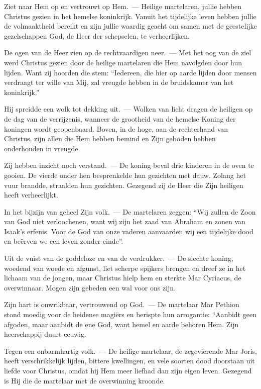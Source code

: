 \documentclass[12pt,twoside,a5paper]{article}
\begin{document}
\begin{halfparskip}
  Ziet naar Hem op en vertrouwt op Hem.~--- Heilige martelaren, jullie hebben Christus gezien in het hemelse koninkrijk. Vanuit het tijdelijke leven hebben jullie de volmaaktheid bereikt en zijn jullie waardig geacht om samen met de geestelijke gezelschappen God, de Heer der schepselen, te verheerlijken.

  De ogen van de Heer zien op de rechtvaardigen neer.~--- Met het oog van de ziel werd Christus gezien door de heilige martelaren die Hem navolgden door hun lijden. Want zij hoorden die stem: ``Iedereen, die hier op aarde lijden door mensen verdraagt ter wille van Mij, zal vreugde hebben in de bruidskamer van het koninkrijk.''

  Hij spreidde een wolk tot dekking uit.~--- Wolken van licht dragen de heiligen op de dag van de verrijzenis, wanneer de grootheid van de hemelse Koning der koningen wordt geopenbaard. Boven, in de hoge, aan de rechterhand van Christus, zijn allen die Hem hebben bemind en Zijn geboden hebben onderhouden in vreugde.

  Zij hebben inzicht noch verstand.~--- De koning beval drie kinderen in de oven te gooien. De vierde onder hen besprenkelde hun gezichten met dauw. Zolang het vuur brandde, straalden hun gezichten. Gezegend zij de Heer die Zijn heiligen heeft verheerlijkt.

  In het bijzijn van geheel Zijn volk.~--- De martelaren zeggen: ``Wij zullen de Zoon van God niet verloochenen, want wij zijn het zaad van Abraham en zonen van Isaak's erfenis. Voor de God van onze vaderen aanvaarden wij een tijdelijke dood en beërven we een leven zonder einde''.

  Uit de vuist van de goddeloze en van de verdrukker.~--- De slechte koning, woedend van woede en afgunst, liet scherpe spijkers brengen en dreef ze in het lichaam van de jongen, maar Christus hielp hem en sterkte Mar Cyriacus, de overwinnaar. Mogen zijn gebeden een wal voor ons zijn.

  Zijn hart is onwrikbaar, vertrouwend op God.~--- De martelaar Mar Pethion stond moedig voor de heidense magiërs en berispte hun arrogantie: ``Aanbidt geen afgoden, maar aanbidt de ene God, want hemel en aarde behoren Hem. Zijn heerschappij duurt eeuwig.

  Tegen een onbarmhartig volk.~--- De heilige martelaar, de zegevierende Mar Joris, heeft verschrikkelijk lijden, bittere kwellingen, en vele soorten dood doorstaan uit liefde voor Christus, omdat hij Hem meer liefhad dan zijn eigen leven. Gezegend is Hij die de martelaar met de overwinning kroonde.


\end{halfparskip}
\end{document}
